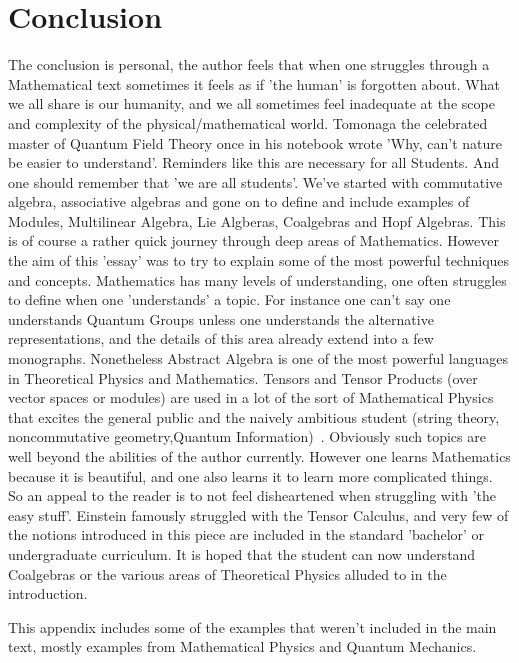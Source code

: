 \documentclass[preprint, 5p, 10pt]{elsarticle}
\theoremstyle{plain}
\begin{document}
\section{Conclusion}
The conclusion is personal, the author feels that when one struggles through a Mathematical text
 sometimes it feels as if 'the human' is forgotten about. What we all share is our humanity, and
we all sometimes feel inadequate at the scope and complexity of the physical/mathematical world. 
Tomonaga the celebrated master of Quantum Field Theory once in his notebook wrote
'Why, can't nature be easier to understand'. Reminders like this are necessary for all Students.
And one should remember that 'we are all students'. 
\phantom{mm} We've started with commutative algebra, associative algebras and gone on to define and include examples
of Modules, Multilinear Algebra, Lie Algberas, Coalgebras and Hopf Algebras.
This is of course a rather quick journey through deep areas of Mathematics. However the aim of this 
'essay' was to try to explain some of the most powerful techniques and concepts.
  Mathematics has many levels of understanding, one often struggles to define when one
'understands' a topic. For instance one can't say one understands Quantum Groups unless one understands
the alternative representations, and the details of this area already extend into a few monographs.
 Nonetheless Abstract Algebra is one of the most powerful languages in Theoretical Physics
 and Mathematics.
Tensors and Tensor Products (over vector spaces or modules) are used in a lot of the sort of Mathematical
Physics that excites the general public and the naively ambitious student (string theory, noncommutative geometry,Quantum Information)~\cite{QuantumFieldsandStrings,Ben-Aryeh2004,Nielsen2000}. 
Obviously such topics are well beyond the abilities of the author currently. However one learns Mathematics because it is beautiful, and one also learns it to learn more complicated
things. So an appeal to the reader is to not feel disheartened when struggling with 'the easy stuff'.
Einstein famously struggled with the Tensor Calculus, and very few of the notions introduced in this 
piece are included in the standard 'bachelor' or undergraduate curriculum. 
 It is hoped that the student can now understand Coalgebras or the various areas of Theoretical Physics
alluded to in the introduction. 

\newpage

This appendix includes some of the examples that weren't included in the main text, mostly examples from 
Mathematical Physics and Quantum Mechanics.
\end{document}
